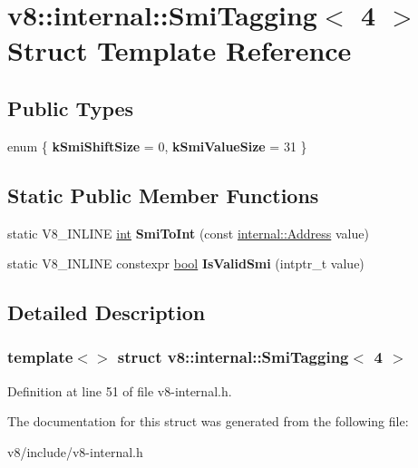 \hypertarget{structv8_1_1internal_1_1SmiTagging_3_014_01_4}{}\section{v8\+:\+:internal\+:\+:Smi\+Tagging$<$ 4 $>$ Struct Template Reference}
\label{structv8_1_1internal_1_1SmiTagging_3_014_01_4}
\subsection*{Public Types}
\begin{DoxyCompactItemize}
\item 
\mbox{\label{structv8_1_1internal_1_1SmiTagging_3_014_01_4_aa2b64cedd7f894f6964fe11746b029e4}} 
enum \{ {\bfseries k\+Smi\+Shift\+Size} = 0, 
{\bfseries k\+Smi\+Value\+Size} = 31
 \}
\end{DoxyCompactItemize}
\subsection*{Static Public Member Functions}
\begin{DoxyCompactItemize}
\item 
\mbox{\label{structv8_1_1internal_1_1SmiTagging_3_014_01_4_ad306fdee17af069303cc78be3defa400}} 
static V8\+\_\+\+I\+N\+L\+I\+NE \mbox{\hyperlink{classint}{int}} {\bfseries Smi\+To\+Int} (const \mbox{\hyperlink{classuintptr__t}{internal\+::\+Address}} value)
\item 
\mbox{\label{structv8_1_1internal_1_1SmiTagging_3_014_01_4_af100af8e269bbeee8c7e12b28d388b4e}} 
static V8\+\_\+\+I\+N\+L\+I\+NE constexpr \mbox{\hyperlink{classbool}{bool}} {\bfseries Is\+Valid\+Smi} (intptr\+\_\+t value)
\end{DoxyCompactItemize}


\subsection{Detailed Description}
\subsubsection*{template$<$$>$\newline
struct v8\+::internal\+::\+Smi\+Tagging$<$ 4 $>$}



Definition at line 51 of file v8-\/internal.\+h.



The documentation for this struct was generated from the following file\+:\begin{DoxyCompactItemize}
\item 
v8/include/v8-\/internal.\+h\end{DoxyCompactItemize}
